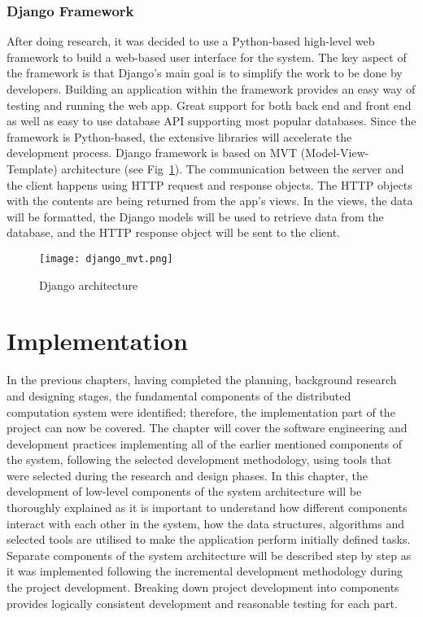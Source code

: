 \documentclass[10pt]{report}
\begin{document}
\subsection{Django Framework} \label{djngo}

After doing research, it was decided to use a Python-based high-level web framework to build a web-based user interface for the system. The key aspect of the framework is that Django's main goal is to simplify the work to be done by developers. Building an application within the framework provides an easy way of testing and running the web app. Great support for both back end and front end as well as easy to use database API supporting most popular databases. Since the framework is Python-based, the extensive libraries will accelerate the development process. Django framework is based on MVT (Model-View-Template) architecture (see Fig~\ref{mvt}). The communication between the server and the client happens using HTTP request and response objects. The HTTP objects with the contents are being returned from the app's views. In the views, the data will be formatted, the Django models will be used to retrieve data from the database, and the HTTP response object will be sent to the client.

\begin{figure}[htp]
    \centering
    \texttt{[image: django\_mvt.png]}
    \caption{Django architecture}
    \label{mvt}
\end{figure}


\chapter{Implementation}

In the previous chapters, having completed the planning, background research and designing stages, the fundamental components of the distributed computation system were identified; therefore, the implementation part of the project can now be covered. The chapter will cover the software engineering and development practices implementing all of the earlier mentioned components of the system, following the selected development methodology, using tools that were selected during the research and design phases. In this chapter, the development of low-level components of the system architecture will be thoroughly explained as it is important to understand how different components interact with each other in the system, how the data structures, algorithms and selected tools are utilised to make the application perform initially defined tasks. Separate components of the system architecture will be described step by step as it was implemented following the incremental development methodology during the project development. Breaking down project development into components provides logically consistent development and reasonable testing for each part.
\end{document}
